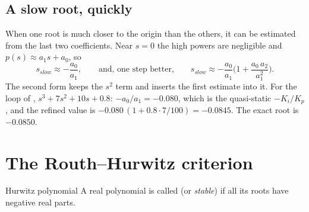 \subsection{A slow root, quickly}
When one root is much closer to the origin than the others, it can be estimated from the last two coefficients. Near $s = 0$ the high powers are negligible and $p(s) \approx a_1 s + a_0$, so
\begin{equation}\label{eq:B-slow}
  s_{slow} \approx -\frac{a_0}{a_1}, \qquad\text{and, one step better,}\qquad s_{slow} \approx -\frac{a_0}{a_1}\Big(1 + \frac{a_0\,a_2}{a_1^2}\Big) .
\end{equation}
The second form keeps the $s^2$ term and inserts the first estimate into it. For the loop of , $s^3 + 7s^2 + 10s + 0.8$: $-a_0/a_1 = -0.080$, which is the quasi-static $-K_i/K_p$, and the refined value is $-0.080\,(1 + 0.8 \cdot 7/100) = -0.0845$. The exact root is $-0.0850$.

\section{The Routh–Hurwitz criterion}

\begin{definition}{Hurwitz polynomial}
A real polynomial is called  (or \emph{stable}) if all its roots have negative real parts.
\end{definition}

